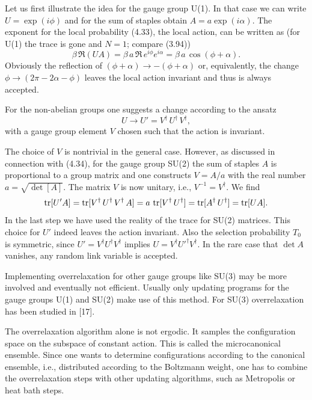 Let us first illustrate the idea for the gauge group U(1). In that case we
can write $U = \exp(i\phi)$ and for the sum of staples obtain $A = a\exp(i\alpha)$. The
exponent for the local probability (4.33), the local action, can be written as
(for U(1) the trace is gone and $N = 1$; compare (3.94))
\begin{equation}
  \beta\,\Re(U A) = \beta\,a\,\Re\,e^{i\phi}e^{i\alpha} = \beta\,a\,\cos(\phi + \alpha).
\end{equation}
Obviously the reflection of $(\phi + \alpha) \to -(\phi + \alpha)$ or, equivalently, the change
$\phi \to (2\pi - 2\alpha - \phi)$ leaves the local action invariant and thus is always accepted.

For the non-abelian groups one suggests a change according to the ansatz
\begin{equation}
  U \to U' = V^\dagger\,U^\dagger\,V^\dagger,
\end{equation}
with a gauge group element $V$ chosen such that the action is invariant.

The choice of $V$ is nontrivial in the general case. However, as discussed
in connection with (4.34), for the gauge group SU(2) the sum of staples $A$
is proportional to a group matrix and one constructs $V = A/a$ with the real
number $a = \sqrt{\det[A]}$. The matrix $V$ is now unitary, i.e., $V^{-1} = V^\dagger$. We find
\begin{equation}
  \operatorname{tr}[U' A] = \operatorname{tr}[V^\dagger\,U^\dagger\,V^\dagger\,A] = a\,\operatorname{tr}[V^\dagger\,U^\dagger]
  = \operatorname{tr}[A^\dagger\,U^\dagger] = \operatorname{tr}[U A].
\end{equation}
In the last step we have used the reality of the trace for SU(2) matrices. This
choice for $U'$ indeed leaves the action invariant. Also the selection probability
$T_0$ is symmetric, since $U' = V^\dagger U^\dagger V^\dagger$ implies $U = V^\dagger U'^\dagger V^\dagger$. In the rare case
that $\det A$ vanishes, any random link variable is accepted.

Implementing overrelaxation for other gauge groups like SU(3) may be
more involved and eventually not efficient. Usually only updating programs
for the gauge groups U(1) and SU(2) make use of this method. For SU(3)
overrelaxation has been studied in [17].

The overrelaxation algorithm alone is not ergodic. It samples the configuration space on the subspace of constant action. This is called the microcanonical ensemble. Since one wants to determine configurations according to
the canonical ensemble, i.e., distributed according to the Boltzmann weight,
one has to combine the overrelaxation steps with other updating algorithms,
such as Metropolis or heat bath steps.

